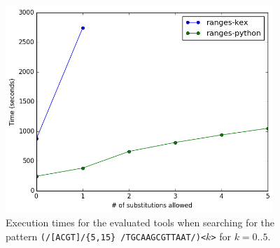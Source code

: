 \begin{figure}[!ht]
  \centering
  \includegraphics[width=0.9\textwidth]{images/ranges.png}
  \caption{Execution times for the evaluated tools when searching for the
    pattern \texttt{(/[ACGT]/\{5,15\} /TGCAAGCGTTAAT/)<$k$>} for $k=0..5$.}
  \label{fig:ranges}
\end{figure}


